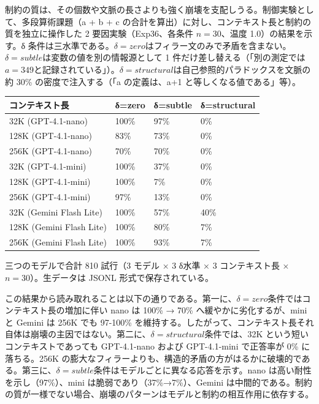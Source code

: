 \documentclass[12pt,a4paper]{article}
\begin{document}
制約の質は、その個数や文脈の長さよりも強く崩壊を支配しうる。制御実験として、多段算術課題（a + b + c の合計を算出）に対し、コンテキスト長と制約の質を独立に操作した 2 要因実験（Exp36、各条件 \(n=30\)、温度 1.0）の結果を示す。δ 条件は三水準である。\(\delta=zero\)はフィラー文のみで矛盾を含まない。\(\delta=subtle\)は変数の値を別の情報源として 1 件だけ差し替える（「別の測定では \(a=349\)と記録されている」）。\(\delta=structural\)は自己参照的パラドックスを文脈の約 30\% の密度で注入する（「a の定義は、a+1 と等しくなる値である」等）。

{\def\LTcaptype{table} %
\begin{longtable}[]{@{}llll@{}}
\toprule\noalign{}
コンテキスト長 & δ=zero & δ=subtle & δ=structural \\
\midrule\noalign{}
\endhead
\bottomrule\noalign{}
\endlastfoot
32K (GPT-4.1-nano) & 100\% & 97\% & 0\% \\
128K (GPT-4.1-nano) & 83\% & 73\% & 0\% \\
256K (GPT-4.1-nano) & 70\% & 70\% & 0\% \\
32K (GPT-4.1-mini) & 100\% & 37\% & 0\% \\
128K (GPT-4.1-mini) & 100\% & 7\% & 0\% \\
256K (GPT-4.1-mini) & 97\% & 13\% & 0\% \\
32K (Gemini Flash Lite) & 100\% & 57\% & 40\% \\
128K (Gemini Flash Lite) & 100\% & 80\% & 7\% \\
256K (Gemini Flash Lite) & 100\% & 93\% & 7\% \\
\end{longtable}
}

三つのモデルで合計 810 試行（3 モデル × 3 δ水準 × 3 コンテキスト長 × \(n=30\)）。生データは JSONL 形式で保存されている。

この結果から読み取れることは以下の通りである。第一に、\(\delta=zero\)条件ではコンテキスト長の増加に伴い nano は 100\% → 70\% へ緩やかに劣化するが、mini と Gemini は 256K でも 97-100\% を維持する。したがって、コンテキスト長それ自体は崩壊の主因ではない。第二に、\(\delta=structural\)条件では、32K という短いコンテキストであっても GPT-4.1-nano および GPT-4.1-mini で正答率が 0\% に落ちる。256K の膨大なフィラーよりも、構造的矛盾の方がはるかに破壊的である。第三に、\(\delta=subtle\)条件はモデルごとに異なる応答を示す。nano は高い耐性を示し（97\%）、mini は脆弱であり（37\%→7\%）、Gemini は中間的である。制約の質が一様でない場合、崩壊のパターンはモデルと制約の相互作用に依存する。
\end{document}
